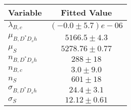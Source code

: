 \begin{tabular}[t]{lc}
\hline
Variable &Fitted Value\\
\hline\hline
$\lambda_{B,c}$&$(-0.0\pm5.7)e-06$\\
\hline
$\mu_{B, D^* D_s h}$&$5166.5\pm4.3$\\
\hline
$\mu_S$&$5278.76\pm0.77$\\
\hline
$n_{B, D^* D_s h}$&$288\pm18$\\
\hline
$n_{B,c}$&$3.0\pm9.0$\\
\hline
$n_S$&$601\pm18$\\
\hline
$\sigma_{B, D^* D_s h}$&$24.4\pm3.1$\\
\hline
$\sigma_S$&$12.12\pm0.61$\\
\hline
\end{tabular}